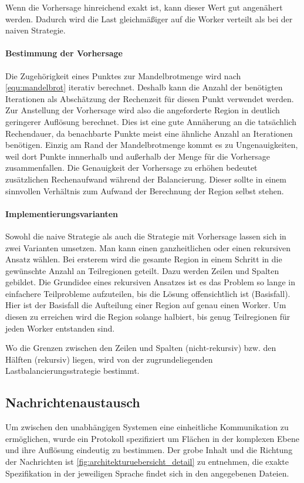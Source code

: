 Wenn die Vorhersage hinreichend exakt ist, kann dieser Wert gut angenähert werden.
Dadurch wird die Last gleichmäßiger auf die Worker verteilt als bei der naiven Strategie.

\paragraph*{Bestimmung der Vorhersage}\label{par:load_balancing_prediction}
Die Zugehörigkeit eines Punktes zur Mandelbrotmenge wird nach \autoref{equ:mandelbrot} iterativ berechnet.
Deshalb kann die Anzahl der benötigten Iterationen als Abschätzung der Rechenzeit für diesen Punkt verwendet werden.
Zur Anstellung der Vorhersage wird also die angeforderte Region in deutlich geringerer Auflösung berechnet.
Dies ist eine gute Annäherung an die tatsächlich Rechendauer, da benachbarte Punkte meist eine ähnliche Anzahl an Iterationen benötigen.
Einzig am Rand der Mandelbrotmenge kommt es zu Ungenauigkeiten, weil dort Punkte innnerhalb und außerhalb der Menge für die Vorhersage zusammenfallen.
Die Genauigkeit der Vorhersage zu erhöhen bedeutet zusätzlichen Rechenaufwand während der Balancierung.
Dieser sollte in einem sinnvollen Verhältnis zum Aufwand der Berechnung der Region selbst stehen.

\paragraph{Implementierungsvarianten}
Sowohl die naive Strategie als auch die Strategie mit Vorhersage lassen sich in zwei Varianten umsetzen.
Man kann einen ganzheitlichen oder einen rekursiven Ansatz wählen.
Bei ersterem wird die gesamte Region in einem Schritt in die gewünschte Anzahl an Teilregionen geteilt.
Dazu werden Zeilen und Spalten gebildet.
Die Grundidee eines rekursiven Ansatzes ist es das Problem so lange in einfachere Teilprobleme aufzuteilen, bis die Lösung offensichtlich ist (Basisfall).
Hier ist der Basisfall die Aufteilung einer Region auf genau einen Worker.
Um diesen zu erreichen wird die Region solange halbiert, bis genug Teilregionen für jeden Worker entstanden sind.

Wo die Grenzen zwischen den Zeilen und Spalten (nicht-rekursiv) bzw. den Hälften (rekursiv) liegen, wird von der zugrundeliegenden Lastbalancierungsstrategie bestimmt.

\subsection{Nachrichtenaustausch}
Um zwischen den unabhängigen Systemen eine einheitliche Kommunikation zu ermöglichen,
wurde ein Protokoll spezifiziert um Flächen in der komplexen Ebene und ihre Auflösung eindeutig zu bestimmen.
Der grobe Inhalt und die Richtung der Nachrichten ist \autoref{fig:architekturuebersicht_detail} zu entnehmen,
die exakte Spezifikation in der jeweiligen Sprache findet sich in den angegebenen Dateien.

